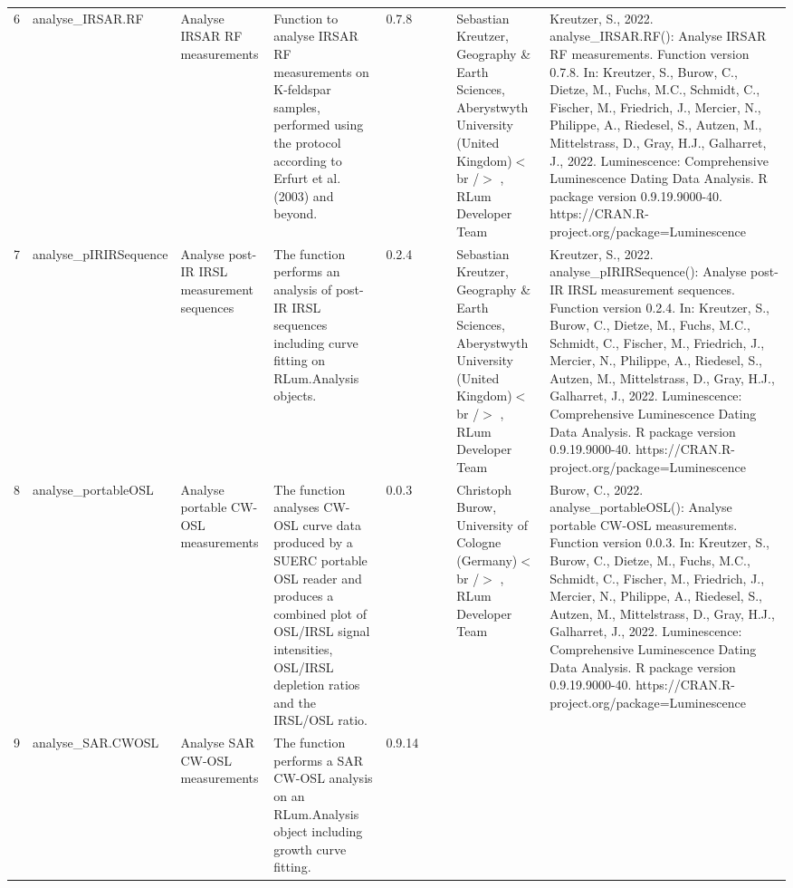 \begin{table}[ht]
\begin{tabular}{rllllllll}
  6 & analyse\_IRSAR.RF & Analyse IRSAR RF measurements & Function to analyse IRSAR RF measurements on K-feldspar samples, performed using the protocol according to Erfurt et al. (2003) and beyond. & 0.7.8
 &  &  & Sebastian Kreutzer, Geography \& Earth Sciences, Aberystwyth University (United Kingdom)$<$br /$>$ , RLum Developer Team & Kreutzer, S., 2022. analyse\_IRSAR.RF(): Analyse IRSAR RF measurements. Function version 0.7.8. In: Kreutzer, S., Burow, C., Dietze, M., Fuchs, M.C., Schmidt, C., Fischer, M., Friedrich, J., Mercier, N., Philippe, A., Riedesel, S., Autzen, M., Mittelstrass, D., Gray, H.J., Galharret, J., 2022. Luminescence: Comprehensive Luminescence Dating Data Analysis. R package version 0.9.19.9000-40. https://CRAN.R-project.org/package=Luminescence
 \\ 
  7 & analyse\_pIRIRSequence & Analyse post-IR IRSL measurement sequences & The function performs an analysis of post-IR IRSL sequences including curve fitting on  RLum.Analysis  objects. & 0.2.4
 &  &  & Sebastian Kreutzer, Geography \& Earth Sciences, Aberystwyth University (United Kingdom)$<$br /$>$ , RLum Developer Team & Kreutzer, S., 2022. analyse\_pIRIRSequence(): Analyse post-IR IRSL measurement sequences. Function version 0.2.4. In: Kreutzer, S., Burow, C., Dietze, M., Fuchs, M.C., Schmidt, C., Fischer, M., Friedrich, J., Mercier, N., Philippe, A., Riedesel, S., Autzen, M., Mittelstrass, D., Gray, H.J., Galharret, J., 2022. Luminescence: Comprehensive Luminescence Dating Data Analysis. R package version 0.9.19.9000-40. https://CRAN.R-project.org/package=Luminescence
 \\ 
  8 & analyse\_portableOSL & Analyse portable CW-OSL measurements & The function analyses CW-OSL curve data produced by a SUERC portable OSL reader and produces a combined plot of OSL/IRSL signal intensities, OSL/IRSL depletion ratios and the IRSL/OSL ratio. & 0.0.3
 &  &  & Christoph Burow, University of Cologne (Germany)$<$br /$>$ , RLum Developer Team & Burow, C., 2022. analyse\_portableOSL(): Analyse portable CW-OSL measurements. Function version 0.0.3. In: Kreutzer, S., Burow, C., Dietze, M., Fuchs, M.C., Schmidt, C., Fischer, M., Friedrich, J., Mercier, N., Philippe, A., Riedesel, S., Autzen, M., Mittelstrass, D., Gray, H.J., Galharret, J., 2022. Luminescence: Comprehensive Luminescence Dating Data Analysis. R package version 0.9.19.9000-40. https://CRAN.R-project.org/package=Luminescence
 \\ 
  9 & analyse\_SAR.CWOSL & Analyse SAR CW-OSL measurements & The function performs a SAR CW-OSL analysis on an RLum.Analysis  object including growth curve fitting. & 0.9.14

\end{tabular}
\end{table}
